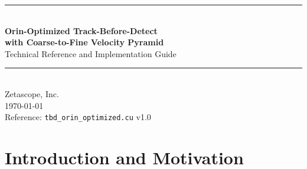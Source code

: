 \documentclass[11pt,letterpaper]{article}
\begin{document}
\begin{center}
    {\color{zetaprimary}\rule{\textwidth}{1.5pt}}\\[12pt]
    {\LARGE\bfseries\color{zetaprimary} Orin-Optimized Track-Before-Detect\\[4pt]
    with Coarse-to-Fine Velocity Pyramid}\\[10pt]
    {\large Technical Reference and Implementation Guide}\\[8pt]
    {\color{zetaprimary}\rule{\textwidth}{1.5pt}}\\[12pt]
    {\large Zetascope, Inc.}\\[4pt]
    {\normalsize \today}\\[4pt]
    {\small\color{gray} Reference: \texttt{tbd\_orin\_optimized.cu} v1.0}
\end{center}

\vspace{8pt}

\begin{abstract}
\noindent
This document provides a complete technical reference for the Orin-optimized
track-before-detect (TBD) implementation targeting the NVIDIA Jetson AGX Orin
platform (sm\_87, Ampere architecture). The implementation replaces the
$\mathcal{O}(N_v^2)$ brute-force velocity search with a three-level
coarse-to-fine velocity pyramid that achieves $25$--$40\times$ reduction in
velocity hypothesis evaluations while preserving detection performance at the
original $\Delta v = 0.05$~pixel/frame resolution. Combined with FP16 frame
storage, bounds-aware trajectory pruning, and GPU-side reduction, the
optimized code fits within the Orin's 32--64~GB unified memory and
${\sim}200$~GB/s bandwidth envelope. On the benchmark problem (4000$\times$2500
pixels, 300 frames, ${\sim}20{,}000$ velocity hypotheses), the pyramid search
completes in an estimated 45--90 seconds on Orin AGX, compared with 30+
minutes for the brute-force baseline ported directly.
\end{abstract}

\tableofcontents
\newpage

\section{Introduction and Motivation}
\label{sec:intro}
\end{document}
